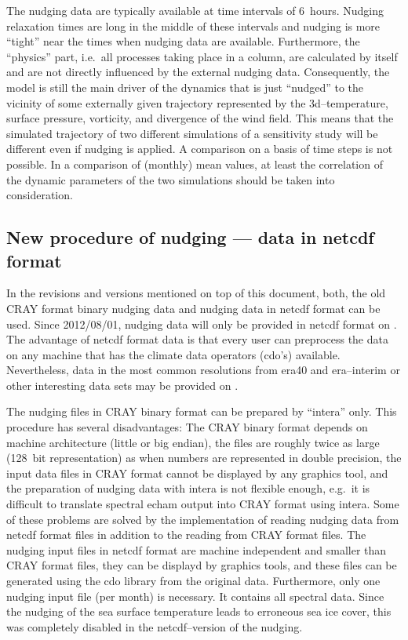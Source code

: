 \begin{appendix}
The nudging data are typically available at time intervals of
6~hours. Nudging relaxation times are long in the middle of these intervals
and nudging is more ``tight'' near the times when nudging data are
available. Furthermore, the ``physics'' part, i.e.~all processes
taking place in a column, are calculated by \echam{} itself and are not
directly influenced by the external nudging data.
Consequently, the \echam{} model is still the main driver
of the dynamics that is just ``nudged'' to the vicinity of some
externally given trajectory represented by the 3d--temperature,
surface pressure, vorticity, and divergence of the wind field.
This means that the simulated trajectory of two different simulations
of a sensitivity study will be different even if nudging is applied. A
comparison on a basis of time steps is not possible. In a comparison
of (monthly) mean values, at least the correlation of the dynamic
parameters of the two simulations should be taken into consideration.

\subsection{New procedure of nudging --- data in netcdf format}

In the \echam{} revisions and versions mentioned on top of this
document, both, the old CRAY format binary nudging data 
and nudging data in netcdf format can be used. Since 2012/08/01,
nudging data will only be provided in netcdf format on . The advantage of netcdf format data is
that every user can preprocess the data on any machine that has the
climate data operators (cdo's) available. Nevertheless, data in the
most common resolutions from era40 and era--interim or other
interesting data sets may be provided on . 

The nudging files in CRAY binary format can be prepared by ``intera''
only. This procedure 
has several disadvantages: The CRAY binary format depends on machine
architecture (little or big endian), the files are roughly twice as
large (128~bit 
representation) as when numbers are represented in double precision,
the input data files in 
CRAY format cannot be displayed by any graphics tool, and the
preparation of nudging 
data with intera is not flexible enough, e.g.~it is difficult to
translate spectral echam output into CRAY format using intera.
Some of these problems are solved by the implementation of reading
nudging data from netcdf format files in addition to the reading from
CRAY format files. The nudging input files in netcdf format are
machine independent and smaller than CRAY format files, they can be
displayd by graphics tools, and these files can be generated using the
cdo library from the original data. Furthermore, only one nudging input file
(per month) is necessary. It contains all spectral data. Since the
nudging of the sea surface temperature leads to erroneous sea ice
cover, this was completely disabled in the netcdf--version of the
nudging.


\end{appendix}
